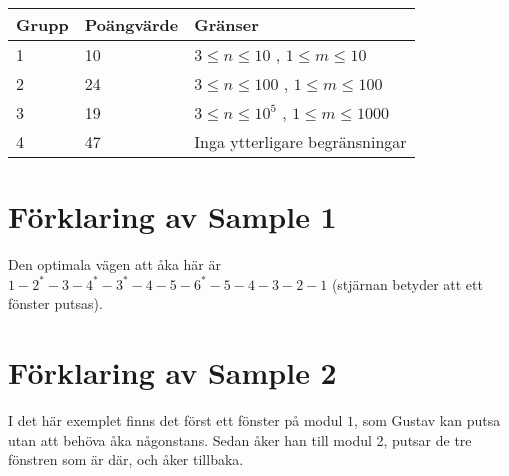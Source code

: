 \noindent
\begin{tabular}{| l | l | l |}
\hline
Grupp & Poängvärde & Gränser \\ \hline
1     & 10         &  $3 \le n \le 10$ , $1 \le m \le 10$ \\ \hline
2     & 24         &  $3 \le n \le 100$ , $1 \le m \le 100$ \\ \hline
3     & 19         &  $3 \le n \le 10^5$ , $1 \le m \le 1000$ \\ \hline
4     & 47         & Inga ytterligare begränsningar \\ \hline
\end{tabular}

\section*{Förklaring av Sample 1}
Den optimala vägen att åka här är $1-2^*-3-4^*-3^*-4-5-6^*-5-4-3-2-1$ (stjärnan betyder att ett fönster putsas).
\section*{Förklaring av Sample 2}
I det här exemplet finns det först ett fönster på modul $1$, som Gustav kan putsa utan att behöva åka någonstans. Sedan åker han till modul 2,
putsar de tre fönstren som är där, och åker tillbaka.
